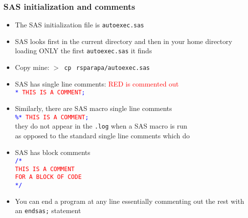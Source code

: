 \documentclass[11pt,pdftex,dvipsnames,usenames,helvetica]{beamer}
\begin{document}
\begin{frame}[fragile]
\frametitle{SAS initialization and comments}
\begin{itemize}
\item The SAS initialization file is {\tt autoexec.sas}
\item SAS looks first in the current directory and then in your
home directory loading ONLY the first {\tt autoexec.sas} it finds
\item Copy mine: {\tt $>$ cp $~$rsparapa/autoexec.sas $~$}
\item SAS has single line comments: \textcolor{red}{RED is commented out}\\
{\tt \textcolor{blue}{*} \textcolor{red}{THIS IS A COMMENT}\textcolor{blue}{;}}
\item Similarly, there are SAS macro single line comments\\
{\tt \textcolor{blue}{\%*} \textcolor{red}{THIS IS A COMMENT}\textcolor{blue}{;}}\\
they do not appear in the {\tt .log} when a SAS macro is run\\
as opposed to the standard single line comments which do
\item SAS has block comments\\
{\tt \textcolor{blue}{/*}\\ 
\textcolor{red}{THIS IS A COMMENT\\
FOR A BLOCK OF CODE}\\
\textcolor{blue}{*/}}
\item You can end a program at any line essentially commenting out
the rest with an {\tt endsas;} statement
\end{itemize}
\end{frame}
\end{document}
